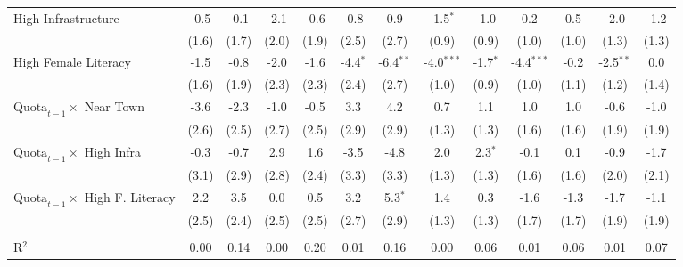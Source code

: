 \begin{adjustbox}{max width=\linewidth}
\begin{threeparttable}[b]
\begin{tabular}{lcccccccccccc}
         High Infrastructure                            & -0.5         & -0.1  & -2.1        & -0.6  & -0.8         & 0.9         & -1.5$^{*}$   & -1.0       & 0.2          & 0.5   & -2.0         & -1.2\\
                                                        & (1.6)        & (1.7) & (2.0)       & (1.9) & (2.5)        & (2.7)       & (0.9)        & (0.9)      & (1.0)        & (1.0) & (1.3)        & (1.3)\\
         High Female Literacy                           & -1.5         & -0.8  & -2.0        & -1.6  & -4.4$^{*}$   & -6.4$^{**}$ & -4.0$^{***}$ & -1.7$^{*}$ & -4.4$^{***}$ & -0.2  & -2.5$^{**}$  & 0.0\\
                                                        & (1.6)        & (1.9) & (2.3)       & (2.3) & (2.4)        & (2.7)       & (1.0)        & (0.9)      & (1.0)        & (1.1) & (1.2)        & (1.4)\\
         $\text{Quota}_{t-1} \times$ Near Town          & -3.6         & -2.3  & -1.0        & -0.5  & 3.3          & 4.2         & 0.7          & 1.1        & 1.0          & 1.0   & -0.6         & -1.0\\
                                                        & (2.6)        & (2.5) & (2.7)       & (2.5) & (2.9)        & (2.9)       & (1.3)        & (1.3)      & (1.6)        & (1.6) & (1.9)        & (1.9)\\
         $\text{Quota}_{t-1} \times$ High Infra         & -0.3         & -0.7  & 2.9         & 1.6   & -3.5         & -4.8        & 2.0          & 2.3$^{*}$  & -0.1         & 0.1   & -0.9         & -1.7\\
                                                        & (3.1)        & (2.9) & (2.8)       & (2.4) & (3.3)        & (3.3)       & (1.3)        & (1.3)      & (1.6)        & (1.6) & (2.0)        & (2.1)\\
         $\text{Quota}_{t-1} \times$ High F. Literacy   & 2.2          & 3.5   & 0.0         & 0.5   & 3.2          & 5.3$^{*}$   & 1.4          & 0.3        & -1.6         & -1.3  & -1.7         & -1.1\\
                                                        & (2.5)        & (2.4) & (2.5)       & (2.5) & (2.7)        & (2.9)       & (1.3)        & (1.3)      & (1.7)        & (1.7) & (1.9)        & (1.9)\\
          \\
         R$^2$                                          & 0.00         & 0.14  & 0.00        & 0.20  & 0.01         & 0.16        & 0.00         & 0.06       & 0.01         & 0.06  & 0.01         & 0.07\\

\end{tabular}
\end{threeparttable}
\end{adjustbox}
